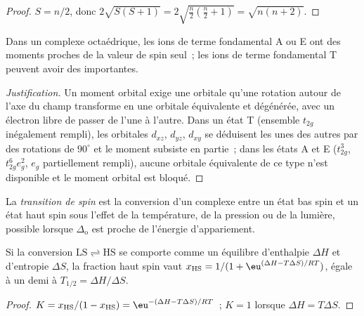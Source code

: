 \begin{proof}
$S = n/2$, donc $2\sqrt{S(S+1)} = 2\sqrt{\frac n2(\frac n2 + 1)} = \sqrt{n(n+2)}$.
\end{proof}

\begin{proposition}\label{prop:b3:complex-spectra-magnetism:orbital-contribution}
Dans un complexe octaédrique, les ions de terme fondamental A ou E ont des
moments proches de la valeur de spin seul~; les ions de terme fondamental T
peuvent avoir des  importantes.
\end{proposition}

\begin{proof}[Justification]
Un moment orbital exige une orbitale qu'une rotation autour de l'axe du
champ transforme en une orbitale équivalente et dégénérée, avec un électron
libre de passer de l'une à l'autre. Dans un état T (ensemble $t_{2g}$
inégalement rempli), les orbitales $d_{xz}$, $d_{yz}$, $d_{xy}$ se déduisent
les unes des autres par des rotations de $90^\circ$ et le moment subsiste en
partie~; dans les états A et E ($t_{2g}^3$, $t_{2g}^6e_g^2$, $e_g$
partiellement rempli), aucune orbitale équivalente de ce type n'est
disponible et le moment orbital est bloqué.
\end{proof}

\begin{definition}\label{def:b3:complex-spectra-magnetism:spin-crossover}
La \emph{transition de spin} est la conversion d'un
complexe entre un état bas spin et un état haut spin sous l'effet de la
température, de la pression ou de la lumière, possible lorsque
$\Delta_{\mathrm o}$ est proche de l'énergie d'appariement.
\end{definition}

\begin{proposition}\label{prop:b3:complex-spectra-magnetism:crossover}
Si la conversion $\mathrm{LS} \rightleftharpoons \mathrm{HS}$ se comporte comme un équilibre
d'enthalpie $\Delta H$ et d'entropie $\Delta S$, la fraction haut spin vaut
$x_{\mathrm{HS}} = 1/(1 + \eu^{(\Delta H - T\Delta S)/RT})$, égale à un demi à $T_{1/2} = \Delta H/\Delta S$.
\end{proposition}

\begin{proof}
$K = x_{\mathrm{HS}}/(1 - x_{\mathrm{HS}}) = \eu^{-(\Delta H - T\Delta S)/RT}$~; $K = 1$ lorsque $\Delta H = T\Delta S$.
\end{proof}

